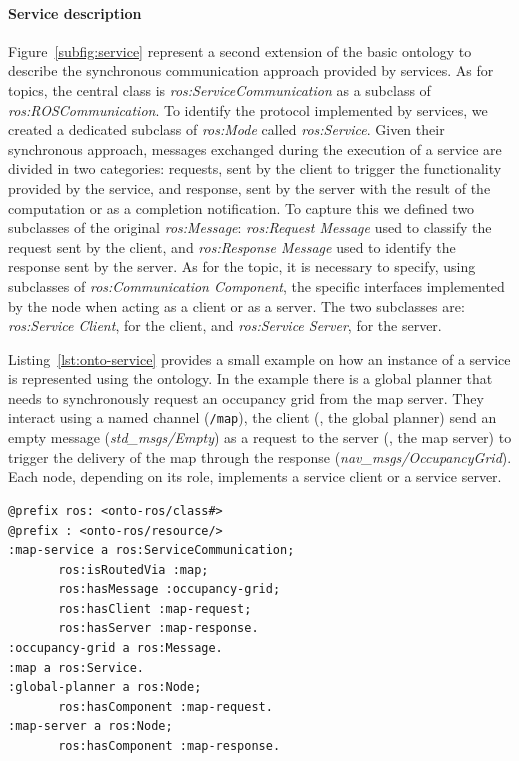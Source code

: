\paragraph{Service description} Figure~\ref{subfig:service} represent a second extension of the basic ontology to describe the synchronous communication approach provided by services.  As for topics, the central class is \textit{ros:Service\-Com\-mu\-ni\-ca\-tion} as a subclass of \textit{ros:ROS\-Com\-mu\-ni\-ca\-tion}. To identify the protocol implemented by services, we created a dedicated subclass of \textit{ros:Mode} called \textit{ros:Service}. Given their
synchronous approach, messages exchanged during the execution of a service are divided in two categories: requests, sent by the client to trigger the functionality provided by the service, and response, sent by the server with the result of the computation or as a completion notification. To capture this we defined two subclasses of the original \textit{ros:Message}: \textit{ros:Request Message} used to classify the request sent by the client, and \textit{ros:Response Message} used to identify the response sent by the server. As for the topic, it is necessary to specify, using subclasses of \textit{ros:Communication Component}, the specific interfaces implemented by the node when acting as a client or as a server. The two subclasses are: \textit{ros:Service Client}, for the client, and \textit{ros:Service Server}, for the server.

Listing~\ref{lst:onto-service} provides a small example on how an instance of a service is represented using the ontology. In the example there is a global planner that needs to synchronously request an occupancy grid from the map server. They interact using a named channel (\texttt{/map}), the client (\ie, the global planner) send an empty message (\textit{std\_msgs/Empty}) as a request to the server (\ie, the map server) to trigger the delivery of the map through the response (\textit{nav\_msgs/OccupancyGrid}). Each node, depending on its role, implements a service client or a service server.

\begin{lstlisting}[frame=tb,caption={TODO},label=lst:onto-service]
@prefix ros: <onto-ros/class#>
@prefix : <onto-ros/resource/>
:map-service a ros:ServiceCommunication;
       ros:isRoutedVia :map;
       ros:hasMessage :occupancy-grid;
       ros:hasClient :map-request;
       ros:hasServer :map-response.
:occupancy-grid a ros:Message.
:map a ros:Service.  
:global-planner a ros:Node;
       ros:hasComponent :map-request.
:map-server a ros:Node;
       ros:hasComponent :map-response.
 \end{lstlisting}
 
